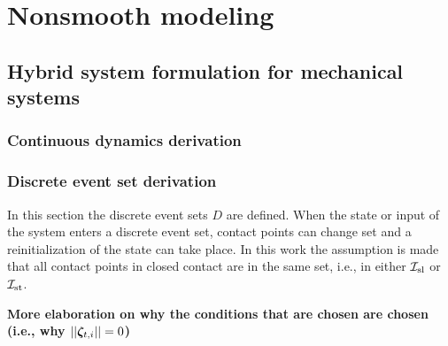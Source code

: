 \documentclass[../DC2017114Bouma.tex]{subfiles}
\begin{document}

\cleartooddpage
\pagestyle{appendix}
\chapter{Nonsmooth modeling}
\section{Hybrid system formulation for mechanical systems}\label{app:hybrid}
\subsection{Continuous dynamics derivation}

\subsection{Discrete event set derivation}\label{app:hybriddisc}
In this section the discrete event sets $D$ are defined. When the state or input of the system enters a discrete event set, contact points can change set and a reinitialization of the state can take place. In this work the assumption is made that all contact points in closed contact are in the same set, i.e., in either $\mathcal{I}_{\text{sl}}$ or $\mathcal{I}_{\text{st}}$.

\textbf{More elaboration on why the conditions that are chosen are chosen (i.e., why $||\boldsymbol{\zeta}_{t,i}||=0$)}
\end{document}
